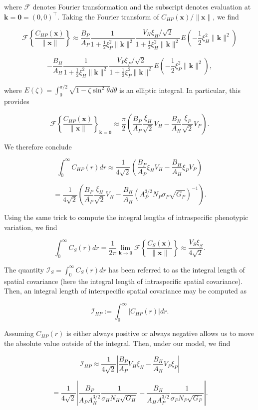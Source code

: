 \documentclass{article}
\begin{document}
where \(\mathcal F\) denotes Fourier transformation and the subscript
denotes evaluation at \(\pmb k=\pmb 0=(0,0)^\top\). Taking the Fourier
transform of \(C_{HP}(\pmb x)/\|\pmb x\|\), we find

\[\mathcal F\left\{\frac{C_{HP}(\pmb x)}{\|\pmb x\|}\right\}\approx\frac{B_P}{A_P}\frac{1}{1+\frac{1}{2}\xi_P^2\|\pmb k\|^2} \frac{V_H\xi_H/\sqrt2}{1+\frac{1}{2}\xi_H^2\|\pmb k\|^2}E\left(-\frac{1}{2}\xi_H^2\|\pmb k\|^2\right)\]

\[-\frac{B_H}{A_H}\frac{1}{1+\frac{1}{2}\xi_H^2\|\pmb k\|^2} \frac{V_P\xi_P/\sqrt2}{1+\frac{1}{2}\xi_P^2\|\pmb k\|^2}E\left(-\frac{1}{2}\xi_P^2\|\pmb k\|^2\right),\]

where \(E(\zeta)=\int_0^{\pi/2}\sqrt{1-\zeta\sin^2\theta}d\theta\) is an
elliptic integral. In particular, this provides

\[\mathcal F\left\{\frac{C_{HP}(\pmb x)}{\|\pmb x\|}\right\}_{\pmb k=\pmb 0}\approx\frac{\pi}{2}\left(\frac{B_P}{A_P}\frac{\xi_H}{\sqrt2}V_H-\frac{B_H}{A_H}\frac{\xi_P}{\sqrt2}V_P\right).\]

We therefore conclude

\[\int_0^\infty C_{HP}(r)dr\approx\frac{1}{4\sqrt2}\left(\frac{B_P}{A_P}\xi_HV_H-\frac{B_H}{A_H}\xi_PV_P\right)\]

\[=\frac{1}{4\sqrt2}\left(\frac{B_P}{A_P}\frac{\xi_H}{\sqrt2}V_H-\frac{B_H}{A_H}\left(A_P^{3/2}N_P\sigma_P\sqrt{G_P}\right)^{-1}\right).\]

Using the same trick to compute the integral lengths of intraspecific
phenotypic variation, we find

\[\int_0^\infty C_S(r)dr=\frac{1}{2\pi}\lim_{\pmb k\to\pmb 0}\mathcal F\left\{\frac{C_S(\pmb x)}{\|\pmb x\|}\right\}\approx\frac{V_S\xi_S}{4\sqrt2}.\]

The quantity \(\mathcal I_S=\int_0^\infty C_S(r)dr\) has been referred
to as the integral length of spatial covariance (here the integral
length of intraspecific spatial covariance). Then, an integral length of
interspecific spatial covariance may be computed as

\[\mathcal I_{HP}:=\int_0^\infty |C_{HP}(r)|dr.\]

Assuming \(C_{HP}(r)\) is either always positive or always negative
allows us to move the absolute value outside of the integral. Then,
under our model, we find

\[\mathcal I_{HP}\approx\frac{1}{4\sqrt2}\left|\frac{B_P}{A_P}V_H\xi_H-\frac{B_H}{A_H}V_P\xi_P\right|\]

\[=\frac{1}{4\sqrt2}\left|\frac{B_P}{A_PA_H^{3/2}}\frac{1}{\sigma_H N_H\sqrt{G_H}}-\frac{B_H}{A_HA_P^{3/2}}\frac{1}{\sigma_P N_P\sqrt{G_P}}\right|.\]
\end{document}
